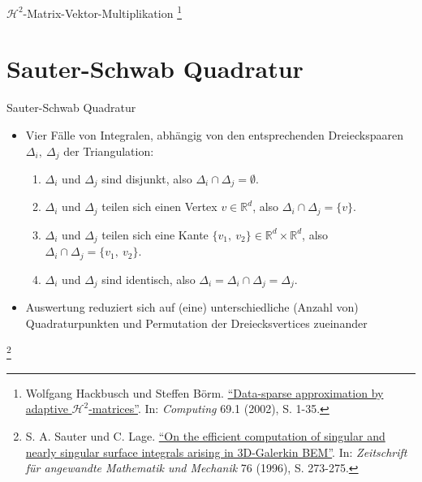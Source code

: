 \documentclass[10pt]{beamer}
\let\svthefootnote\thefootnote
\begin{document}
\begin{frame}{\(\mathcal{H}^2\)-Matrix-Vektor-Multiplikation}
  \footnotesize
  \let\thefootnote\relax\footnote{Wolfgang Hackbusch und Steffen B{\"o}rm.
  \href{https://link.springer.com/article/10.1007\%2Fs00607-002-1450-4?LI=true}{``Data-sparse approximation by adaptive \(\mathcal{H}^2\)-matrices''}. In:
   \textit{Computing} 69.1 (2002), S. 1-35.}
  \addtocounter{footnote}{-1}\let\thefootnote\svthefootnote\relax
  \normalsize
\end{frame}

\section{Sauter-Schwab Quadratur}

\begin{frame}{Sauter-Schwab Quadratur}
  \begin{itemize}
    \item Vier Fälle von Integralen, abhängig von den entsprechenden 
          Dreieckspaaren \( \Delta_{i}, \ \Delta_{j} \) der Triangulation:
    \begin{enumerate}
        \item \( \Delta_{i} \) und \( \Delta_{j} \) sind disjunkt, also \(
                 \Delta_{i} \cap \Delta_{j} = \emptyset \).
        \item \( \Delta_{i} \) und \( \Delta_{j} \) teilen sich einen Vertex \(
                 v \in \mathbb{R}^{d} \), also \( \Delta_{i} \cap \Delta_{j} = 
                 \{ v \} \).
        \item \( \Delta_{i} \) und \( \Delta_{j} \) teilen sich eine Kante
              \( \{ v_{1}, \ v_{2} \} \in \mathbb{R}^{d} \times \mathbb{R}^{d} 
              \), also \( \Delta_{i} \cap \Delta_{j} = \{ v_{1}, \ v_{2} \} \).
        \item \( \Delta_{i} \) und \( \Delta_{j} \) sind identisch, also \(
                 \Delta_{i} = \Delta_{i} \cap \Delta_{j} = \Delta_{j} \).
    \end{enumerate}
    \item Auswertung reduziert sich auf (eine) unterschiedliche (Anzahl von)
          Quadraturpunkten und Permutation der Dreiecksvertices zueinander
  \end{itemize}

  \footnotesize
  \let\thefootnote\relax\footnote{S. A. Sauter und C. Lage.
  \href{https://link.springer.com/article/10.1007\%2Fs00211-015-0757-y}{
  ``On the efficient computation of singular and nearly singular surface 
  integrals arising in 3D-Galerkin BEM''}. In:   \textit{Zeitschrift f\"ur 
  angewandte Mathematik und Mechanik } 76 (1996), S. 273-275.}
  \addtocounter{footnote}{-1}\let\thefootnote\svthefootnote\relax
  \normalsize
\end{frame}
\end{document}
